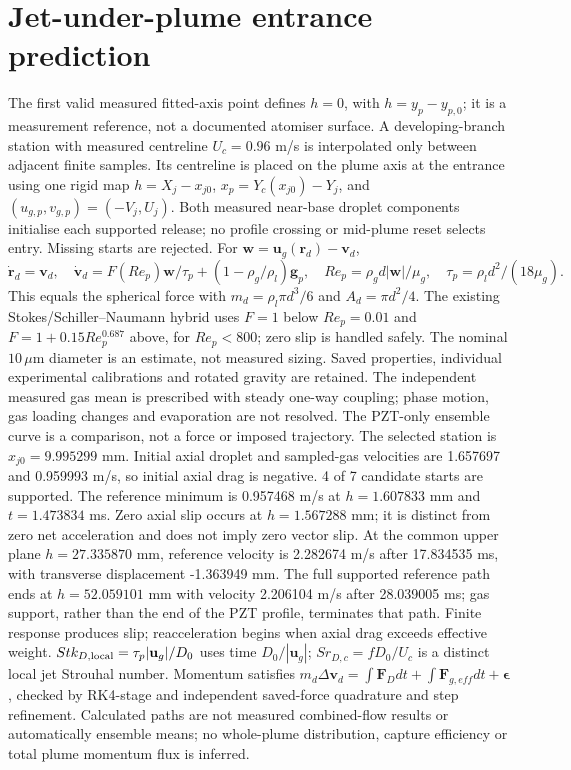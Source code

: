 \section{Jet-under-plume entrance prediction}
The first valid measured fitted-axis point defines $h=0$, with $h=y_p-y_{p,0}$;
it is a measurement reference, not a documented atomiser surface.
A developing-branch station with measured centreline $U_c=0.96$ m/s is interpolated
only between adjacent finite samples. Its centreline is placed on the plume axis
at the entrance using one rigid map $h=X_j-x_{j0}$,
$x_p=Y_c(x_{j0})-Y_j$, and $(u_{g,p},v_{g,p})=(-V_j,U_j)$.
Both measured near-base droplet components initialise each supported release;
no profile crossing or mid-plume reset selects entry. Missing starts are rejected.
For $\mathbf w=\mathbf u_g(\mathbf r_d)-\mathbf v_d$,
\[
\dot{\mathbf r}_d=\mathbf v_d,\quad
\dot{\mathbf v}_d=F(Re_p)\mathbf w/\tau_p+(1-\rho_g/\rho_l)\mathbf g_p,
\quad Re_p=\rho_gd|\mathbf w|/\mu_g,\quad \tau_p=\rho_ld^2/(18\mu_g).
\]
This equals the spherical force with $m_d=\rho_l\pi d^3/6$ and $A_d=\pi d^2/4$.
The existing Stokes/Schiller--Naumann hybrid uses $F=1$ below $Re_p=0.01$ and
$F=1+0.15Re_p^{0.687}$ above, for $Re_p<800$; zero slip is handled safely.
The nominal $10\,\mu$m diameter is an estimate, not measured sizing.
Saved properties, individual experimental calibrations and rotated gravity are retained.
The independent measured gas mean is prescribed with steady one-way coupling;
phase motion, gas loading changes and evaporation are not resolved.
The PZT-only ensemble curve is a comparison, not a force or imposed trajectory.
The selected station is $x_{j0}=9.995299$ mm. Initial axial droplet and sampled-gas velocities are 1.657697 and 0.959993 m/s, so initial axial drag is negative. 4 of 7 candidate starts are supported. The reference minimum is 0.957468 m/s at $h=1.607833$ mm and $t=1.473834$ ms. Zero axial slip occurs at $h=1.567288$ mm; it is distinct from zero net acceleration and does not imply zero vector slip. At the common upper plane $h=27.335870$ mm, reference velocity is 2.282674 m/s after 17.834535 ms, with transverse displacement -1.363949 mm. The full supported reference path ends at $h=52.059101$ mm with velocity 2.206104 m/s after 28.039005 ms; gas support, rather than the end of the PZT profile, terminates that path. Finite response produces slip; reacceleration begins when axial drag exceeds effective weight.
$Stk_{D,\rm local}=\tau_p|\mathbf u_g|/D_0$ uses time $D_0/|\mathbf u_g|$;
$Sr_{D,c}=fD_0/U_c$ is a distinct local jet Strouhal number.
Momentum satisfies $m_d\Delta\mathbf v_d=\int\mathbf F_Ddt+\int\mathbf F_{g,eff}dt+\boldsymbol\epsilon$,
checked by RK4-stage and independent saved-force quadrature and step refinement.
Calculated paths are not measured combined-flow results or automatically ensemble means;
no whole-plume distribution, capture efficiency or total plume momentum flux is inferred.
